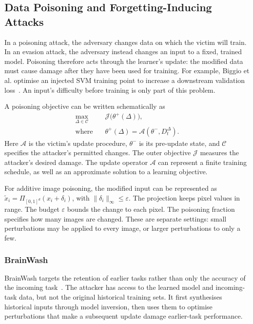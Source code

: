 \subsection{Data Poisoning and Forgetting-Inducing Attacks}
\label{subsec:bg-poisoning}

In a poisoning attack, the adversary changes data on which the victim will
train. In an evasion attack, the adversary instead changes an input to a
fixed, trained model. Poisoning therefore acts through the learner's update:
the modified data must cause damage after they have been used for training.
For example, Biggio et al. optimise an injected SVM training point to
increase a downstream validation loss~\cite{biggio2012poisoning}. An input's
difficulty before training is only part of this problem.

A poisoning objective can be written schematically as
\begin{align}
    \max_{\Delta\in\mathcal{C}}\quad&
      \mathcal{J}\bigl(\theta^{+}(\Delta)\bigr),\label{eq:bg-poison-outer}\\
    \text{where}\quad&
      \theta^{+}(\Delta)=
      \mathcal{A}(\theta^{-},D_t^{\Delta}).\label{eq:bg-poison-inner}
\end{align}
Here $\mathcal{A}$ is the victim's update procedure, $\theta^{-}$ is its
pre-update state, and $\mathcal{C}$ specifies the attacker's permitted
changes. The outer objective $\mathcal{J}$ measures the attacker's desired
damage. The update operator $\mathcal{A}$ can represent a finite training
schedule, as well as an approximate solution to a learning objective.

For additive image poisoning, the modified input can be represented as
$\widetilde{x}_i=\Pi_{[0,1]^d}(x_i+\delta_i)$, with
$\|\delta_i\|_\infty\leq\varepsilon$. The projection keeps pixel values in
range. The budget $\varepsilon$ bounds the change to each pixel. The
poisoning fraction specifies how many images are changed. These are separate
settings: small perturbations may be applied to every image, or larger
perturbations to only a few.

\subsubsection{BrainWash}

BrainWash targets the retention of earlier tasks rather than only the
accuracy of the incoming task~\cite{abbasi2024brainwash}. The attacker has
access to the learned model and incoming-task data, but not the original
historical training sets. It first synthesises historical inputs through
model inversion, then uses them to optimise perturbations that make a
subsequent update damage earlier-task performance.

